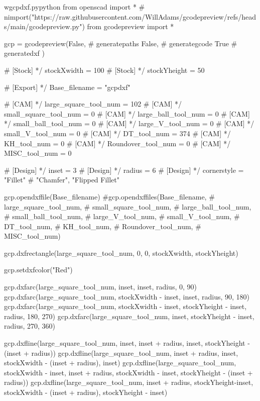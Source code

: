 \documentclass{ltxdoc}
\begin{document}
\lstset{firstnumber=1}%
\begin{writecode}{w}{gcpdxf.py}{python}
from openscad import *
# nimport("https://raw.githubusercontent.com/WillAdams/gcodepreview/refs/heads/main/gcodepreview.py")
from gcodepreview import *

gcp = gcodepreview(False, # generatepaths
                   False, # generategcode
                   True   # generatedxf
                   )

# [Stock] */
stockXwidth = 100
# [Stock] */
stockYheight = 50

# [Export] */
Base_filename = "gcpdxf"


# [CAM] */
large_square_tool_num = 102
# [CAM] */
small_square_tool_num = 0
# [CAM] */
large_ball_tool_num = 0
# [CAM] */
small_ball_tool_num = 0
# [CAM] */
large_V_tool_num = 0
# [CAM] */
small_V_tool_num = 0
# [CAM] */
DT_tool_num = 374
# [CAM] */
KH_tool_num = 0
# [CAM] */
Roundover_tool_num = 0
# [CAM] */
MISC_tool_num = 0

# [Design] */
inset = 3
# [Design] */
radius = 6
# [Design] */
cornerstyle = "Fillet"  # "Chamfer", "Flipped Fillet"

gcp.opendxffile(Base_filename)
#gcp.opendxffiles(Base_filename, 
#                 large_square_tool_num, 
#                 small_square_tool_num, 
#                 large_ball_tool_num, 
#                 small_ball_tool_num, 
#                 large_V_tool_num, 
#                 small_V_tool_num, 
#                 DT_tool_num, 
#                 KH_tool_num, 
#                 Roundover_tool_num, 
#                 MISC_tool_num)

gcp.dxfrectangle(large_square_tool_num, 0, 0, stockXwidth, stockYheight)

gcp.setdxfcolor("Red")

gcp.dxfarc(large_square_tool_num, inset, inset, radius,  0, 90)
gcp.dxfarc(large_square_tool_num, stockXwidth - inset, inset, radius, 90, 180)
gcp.dxfarc(large_square_tool_num, stockXwidth - inset, stockYheight - inset, radius, 180, 270)
gcp.dxfarc(large_square_tool_num, inset, stockYheight - inset, radius, 270, 360)

gcp.dxfline(large_square_tool_num, inset, inset + radius, inset, stockYheight - (inset + radius))
gcp.dxfline(large_square_tool_num, inset + radius, inset, stockXwidth - (inset + radius), inset)
gcp.dxfline(large_square_tool_num, stockXwidth - inset, inset + radius, stockXwidth - inset, stockYheight - (inset + radius))
gcp.dxfline(large_square_tool_num, inset + radius, stockYheight-inset, stockXwidth - (inset + radius), stockYheight - inset)
    

\end{writecode}
\end{document}
